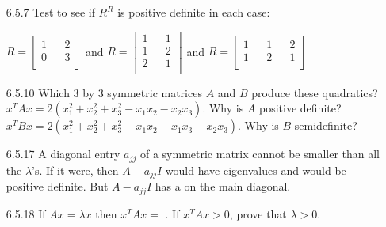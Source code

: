 \documentclass[10pt,twoside,reqno]{article}
\begin{document}
\begin{enumerate}
\item[6.5.7]  Test to see if $R^R$ is positive definite in each case:\\ 
\begin{center}
$
$$
R =
\begin{bmatrix}
1 && 2\\
0 && 3\\
\end{bmatrix}
$$
$
and 
$
$$
R = 
\begin{bmatrix}
1 && 1\\
1 && 2\\
2 && 1\\
\end{bmatrix}
$$
$
and
$
$$
R = 
\begin{bmatrix}
1 && 1 && 2\\
1 && 2 && 1\\
\end{bmatrix}
$$
$
\end{center}


\vspace{3mm}
\item[6.5.10] Which 3 by 3 symmetric matrices $A$ and $B$ produce these quadratics?\\
$x^TAx = 2(x_1^2 + x_2^2 + x_3^2 - x_1x_2 - x_2x_3)$. Why is $A$ positive definite?\\
$x^TBx = 2(x_1^2 + x_2^2 + x_3^2 - x_1x_2 - x_1x_3-x_2x_3)$. Why is $B$ semidefinite?\\


\vspace{3mm}
\item[6.5.17] A diagonal entry $a_{jj}$ of a symmetric matrix cannot be smaller than all the $\lambda$'s. If it were, then $A - a_{jj}I$ would have \underline{\hspace{7mm}} eigenvalues and would be positive definite. But $A - a_{jj}I$ has a \underline{\hspace{7mm}} on the main diagonal.\\


\vspace{3mm}
\item[6.5.18] If $Ax = \lambda x$ then $x^TAx =$ \underline{\hspace{7mm}}. If $x^TAx > 0$, prove that $\lambda > 0$.\\



\end{enumerate}
\end{document}
